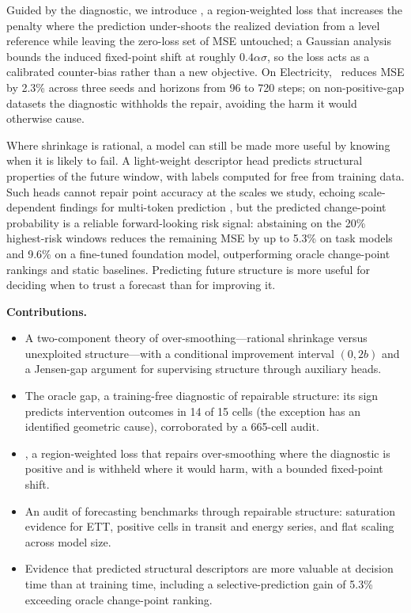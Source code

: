 Guided by the diagnostic, we introduce \rfc, a region-weighted loss that increases the penalty where the prediction under-shoots the realized deviation from a level reference while leaving the zero-loss set of MSE untouched; a Gaussian analysis bounds the induced fixed-point shift at roughly $0.4\alpha\sigma$, so the loss acts as a calibrated counter-bias rather than a new objective. On Electricity, \rfc~reduces MSE by 2.3\% across three seeds and horizons from 96 to 720 steps; on non-positive-gap datasets the diagnostic withholds the repair, avoiding the harm it would otherwise cause.

Where shrinkage is rational, a model can still be made more useful by knowing when it is likely to fail. A light-weight descriptor head predicts structural properties of the future window, with labels computed for free from training data. Such heads cannot repair point accuracy at the scales we study, echoing scale-dependent findings for multi-token prediction \citep{gloeckle2024mtp,fsf}, but the predicted change-point probability is a reliable forward-looking risk signal: abstaining on the 20\% highest-risk windows reduces the remaining MSE by up to 5.3\% on task models and 9.6\% on a fine-tuned foundation model, outperforming oracle change-point rankings and static baselines. Predicting future structure is more useful for deciding when to trust a forecast than for improving it.

\textbf{Contributions.}
\begin{itemize}\setlength\itemsep{1pt}
    \item A two-component theory of over-smoothing---rational shrinkage versus unexploited structure---with a conditional improvement interval $(0, 2b)$ and a Jensen-gap argument for supervising structure through auxiliary heads.
    \item The oracle gap, a training-free diagnostic of repairable structure: its sign predicts intervention outcomes in 14 of 15 cells (the exception has an identified geometric cause), corroborated by a 665-cell audit.
    \item \rfc, a region-weighted loss that repairs over-smoothing where the diagnostic is positive and is withheld where it would harm, with a bounded fixed-point shift.
    \item An audit of forecasting benchmarks through repairable structure: saturation evidence for ETT, positive cells in transit and energy series, and flat scaling across model size.
    \item Evidence that predicted structural descriptors are more valuable at decision time than at training time, including a selective-prediction gain of 5.3\% exceeding oracle change-point ranking.
\end{itemize}
